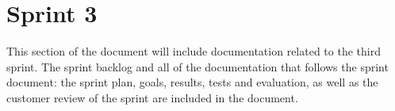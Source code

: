 \documentclass[../document.tex]{subfiles}
\begin{document}
\section{Sprint 3}

This section of the document will include documentation related to the third sprint. The sprint backlog and all of the documentation that follows the sprint document: the sprint plan, goals, results, tests and evaluation, as well as the customer review of the sprint are included in the document.
\end{document}
